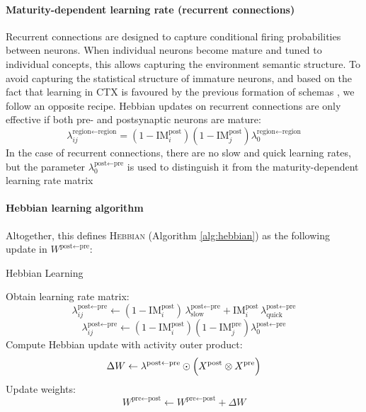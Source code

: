 \documentclass{article}
\begin{document}
\paragraph*{Maturity-dependent learning rate (recurrent connections)}
Recurrent connections are designed to capture conditional firing probabilities between neurons. When individual neurons become mature and tuned to individual concepts, this allows capturing the environment semantic structure. To avoid capturing the statistical structure of immature neurons, and based on the fact that learning in CTX is favoured by the previous formation of schemas , we follow an opposite recipe. Hebbian updates on recurrent connections are only effective if both pre- and postsynaptic neurons are mature:
\begin{equation}
    \lambda_{ij}^{\textrm{region} \leftarrow \textrm{region}} = (1 - \textrm{IM}^\textrm{post}_i)(1 - \textrm{IM}^\textrm{post}_j)\lambda^{\textrm{region}\leftarrow\textrm{region}}_0
\end{equation}
In the case of recurrent connections, there are no slow and quick learning rates, but the parameter $\lambda^{\textrm{post}\leftarrow\textrm{pre}}_0$ is used to distinguish it from the maturity-dependent learning rate matrix 
\paragraph*{Hebbian learning algorithm}
Altogether, this defines \textsc{Hebbian} (Algorithm \ref{alg:hebbian}) as the following update in $W^{\textrm{post} \leftarrow \textrm{pre}}$:
\begin{algorithm}
\caption{Hebbian Learning}\label{alg:hebbian}
\begin{algorithmic}[1]
    \State Obtain learning rate matrix:
    \State
        \[
            \lambda_{ij}^{\textrm{post} \leftarrow \textrm{pre}}
            \gets
            (1-\textrm{IM}^\textrm{post}_i)\,\lambda^{\textrm{post} \leftarrow \textrm{pre}}_\textrm{slow}
            + \textrm{IM}^\textrm{post}_i\,\lambda^{\textrm{post}\leftarrow\textrm{pre}}_{\textrm{quick}}
        \]
    \Else
    \State 
    \[
    \lambda_{ij}^{\textrm{post} \leftarrow \textrm{pre}} \gets (1 - \textrm{IM}^\textrm{post}_i)(1 - \textrm{IM}^\textrm{pre}_j)\lambda^{\textrm{post}\leftarrow\textrm{pre}}_\textrm{0}
    \]
    \EndIf
    \State Compute Hebbian update with activity outer product:
        \[
            \Delta W \gets \lambda^{\textrm{post} \leftarrow \textrm{pre}} \odot 
            \Bigl(X^{\textrm{post}} \otimes X^{\textrm{pre}}\Bigr)
        \]
    \State Update weights:
        \[
            W^{\textrm{pre} \leftarrow \textrm{post}} 
            \gets 
            W^{\textrm{pre} \leftarrow \textrm{post}} + \Delta W
        \]
\EndFunction
\end{algorithmic}
\end{algorithm}
\end{document}
